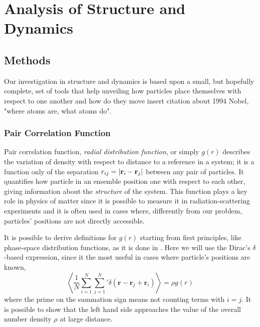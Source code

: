 \documentclass[../../master_thesis_np.tex]{subfiles}
\begin{document}
	\chapter{Analysis of Structure and Dynamics}
	
	\section{Methods}
	Our investigation in structure and dynamics is based upon a small, but hopefully complete, set of tools that help unveiling how particles place themselves with respect to one another and how do they move {\color{blue} insert citation about 1994 Nobel, "where atoms are, what atoms do"}.
	
		\subsection{Pair Correlation Function}
		Pair correlation function, \emph{radial distribution function}, or simply $g(r)$ describes the variation of density with respect to distance to a reference in a system; it is a function only of the separation $r_{ij} = \abs{\vb{r}_i - \vb{r}_j}$ between any pair of particles. 
		It quantifies how particle in an ensemble position one with respect to each other, giving information about the \emph{structure} of the system. 
		This function plays a key role in physics of matter since it is possible to measure it in radiation-scattering experiments and it is often used in cases where, differently from our problem, particles' positions are not directly accessible.
		
		It is possible to derive definitions for $g(r)$ starting from first principles, like phase-space distribution functions, as it is done in \cite{hansen90a}. 
		Here we will use the Dirac's $\delta$-based expression, since it the most useful in cases where particle's positions are known,
		\begin{equation}
			\left\langle \frac{1}{N} \sum_{i=1}^{N} \sum_{j=1}^{N}{}' \delta (\mathbf{r} - \mathbf{r}_j + \mathbf{r}_i) \right\rangle = \rho g(r)
		\end{equation}
		where the prime on the summation sign means not counting terms with $i = j$. 
		It is possible to show that the left hand side approaches the value of the overall number density $\rho$ at large distance.
		
\end{document}
